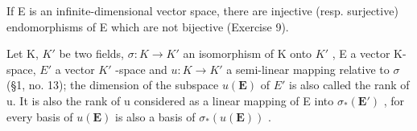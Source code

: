 If E is an infinite-dimensional vector space, there are injective (resp. surjective) endomorphisms of E which are not bijective (Exercise 9).

Let K, \(K'\) be two fields, \(\sigma:K\to K'\) an isomorphism of K onto \(K'\) , E a vector K-space, \(E'\) a vector \(K'\) -space and \(u:K\to K'\) a semi-linear mapping relative to \(\sigma\) (§1, no. 13); the dimension of the subspace \(u(\mathbf{E})\) of \(E'\) is also called the rank of u. It is also the rank of u considered as a linear mapping of E into \(\sigma_{*}(\mathbf{E}')\) , for every basis of \(u(\mathbf{E})\) is also a basis of \(\sigma_{*}(u(\mathbf{E}))\) .

